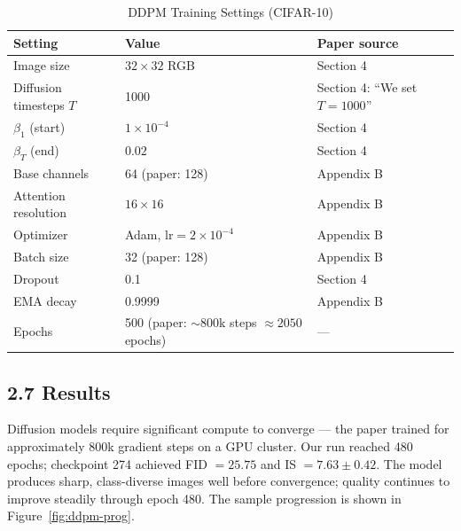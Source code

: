 \documentclass{article}
\begin{document}
\begin{table}[H]
\centering
\caption{DDPM Training Settings (CIFAR-10)}
\begin{tabular}{lll}
\toprule
\textbf{Setting} & \textbf{Value} & \textbf{Paper source} \\
\midrule
Image size          & $32{\times}32$ RGB            & Section 4 \\
Diffusion timesteps $T$ & 1000                      & Section 4: ``We set $T = 1000$'' \\
$\beta_1$ (start)   & $1{\times}10^{-4}$            & Section 4 \\
$\beta_T$ (end)     & $0.02$                        & Section 4 \\
Base channels       & 64 (paper: 128)               & Appendix B \\
Attention resolution & $16{\times}16$               & Appendix B \\
Optimizer           & Adam, lr$=2{\times}10^{-4}$   & Appendix B \\
Batch size          & 32 (paper: 128)               & Appendix B \\
Dropout             & 0.1                           & Section 4 \\
EMA decay           & 0.9999                        & Appendix B \\
Epochs              & 500 (paper: ${\sim}800$k steps $\approx 2050$ epochs) & --- \\
\bottomrule
\end{tabular}
\end{table}

\subsection{2.7 \; Results}

Diffusion models require significant compute to converge --- the paper trained for approximately 800k gradient steps on a GPU cluster. Our run reached 480 epochs; checkpoint 274 achieved FID $= 25.75$ and IS $= 7.63 \pm 0.42$. The model produces sharp, class-diverse images well before convergence; quality continues to improve steadily through epoch 480. The sample progression is shown in Figure~\ref{fig:ddpm-prog}.
\end{document}
